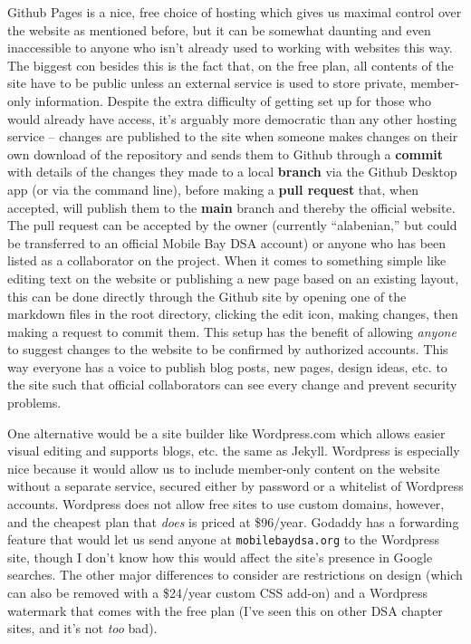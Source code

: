 \documentclass[
]{book}
\begin{document}
Github Pages is a nice, free choice of hosting which gives us maximal control over the website as mentioned before, but it can be somewhat daunting and even inaccessible to anyone who isn't already used to working with websites this way. The biggest con besides this is the fact that, on the free plan, all contents of the site have to be public unless an external service is used to store private, member-only information. Despite the extra difficulty of getting set up for those who would already have access, it's arguably more democratic than any other hosting service -- changes are published to the site when someone makes changes on their own download of the repository and sends them to Github through a \textbf{commit} with details of the changes they made to a local \textbf{branch} via the Github Desktop app (or via the command line), before making a \textbf{pull request} that, when accepted, will publish them to the \textbf{main} branch and thereby the official website. The pull request can be accepted by the owner (currently ``alabenian,'' but could be transferred to an official Mobile Bay DSA account) or anyone who has been listed as a collaborator on the project. When it comes to something simple like editing text on the website or publishing a new page based on an existing layout, this can be done directly through the Github site by opening one of the markdown files in the root directory, clicking the edit icon, making changes, then making a request to commit them. This setup has the benefit of allowing \emph{anyone} to suggest changes to the website to be confirmed by authorized accounts. This way everyone has a voice to publish blog posts, new pages, design ideas, etc. to the site such that official collaborators can see every change and prevent security problems.

One alternative would be a site builder like Wordpress.com which allows easier visual editing and supports blogs, etc. the same as Jekyll. Wordpress is especially nice because it would allow us to include member-only content on the website without a separate service, secured either by password or a whitelist of Wordpress accounts. Wordpress does not allow free sites to use custom domains, however, and the cheapest plan that \emph{does} is priced at \$96/year. Godaddy has a forwarding feature that would let us send anyone at \texttt{mobilebaydsa.org} to the Wordpress site, though I don't know how this would affect the site's presence in Google searches. The other major differences to consider are restrictions on design (which can also be removed with a \$24/year custom CSS add-on) and a Wordpress watermark that comes with the free plan (I've seen this on other DSA chapter sites, and it's not \emph{too} bad).
\end{document}
